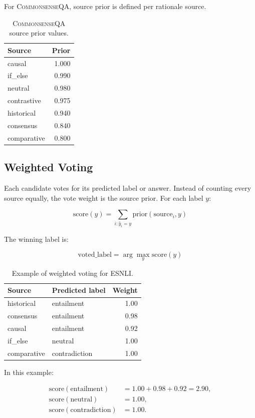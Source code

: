 \documentclass[11pt]{article}
\newcommand{\dataset}[1]{\textsc{#1}}
\begin{document}
For \dataset{CommonsenseQA}, source prior is defined per rationale source.

\begin{table}[H]
\centering
\caption{\dataset{CommonsenseQA} source prior values.}
\begin{tabular}{lr}
\toprule
Source & Prior \\
\midrule
causal & 1.000 \\
if\_else & 0.990 \\
neutral & 0.980 \\
contrastive & 0.975 \\
historical & 0.940 \\
consensus & 0.840 \\
comparative & 0.800 \\
\bottomrule
\end{tabular}
\end{table}

\subsection{Weighted Voting}

Each candidate votes for its predicted label or answer. Instead of counting every source equally, the vote weight is the source prior. For each label $y$:

\[
\mathrm{score}(y) = \sum_{i: \hat{y}_i = y} \mathrm{prior}(\mathrm{source}_i, y)
\]

The winning label is:

\[
\mathrm{voted\_label} = \arg\max_y \mathrm{score}(y)
\]

\begin{table}[H]
\centering
\caption{Example of weighted voting for \dataset{ESNLI}.}
\begin{tabular}{llr}
\toprule
Source & Predicted label & Weight \\
\midrule
historical & entailment & 1.00 \\
consensus & entailment & 0.98 \\
causal & entailment & 0.92 \\
if\_else & neutral & 1.00 \\
comparative & contradiction & 1.00 \\
\bottomrule
\end{tabular}
\end{table}

In this example:

\begin{align*}
\mathrm{score}(\mathrm{entailment}) &= 1.00 + 0.98 + 0.92 = 2.90,\\
\mathrm{score}(\mathrm{neutral}) &= 1.00,\\
\mathrm{score}(\mathrm{contradiction}) &= 1.00.
\end{align*}
\end{document}
